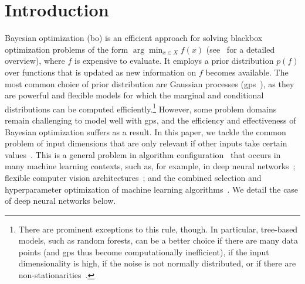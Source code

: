 \documentclass{article}
\newcommand{\bo}{{\sc bo}}
\newcommand{\gp}{{\sc gp}}
\begin{document}
\section{Introduction}
\vspace{-0.05in} 


Bayesian optimization (\bo) is an efficient approach for solving blackbox optimization problems of the form $\arg\min_{x \in X} f(x)$ (see~\cite{Brochu2010} for a detailed overview), where $f$ is expensive to evaluate. 
It employs a prior distribution $p(f)$ over functions that is updated as new information on $f$ becomes available.
%
The most common choice of prior distribution are Gaussian processes (\gp s~\cite{rasmussen38gaussian}), as they are powerful and flexible models for which the marginal and conditional distributions can be computed efficiently.\footnote{There are prominent exceptions to this rule, though. In particular, tree-based models, such as random forests, can be a better choice if there are many data points (and \gp s thus become computationally inefficient), if the input dimensionality is high, if the noise is not normally distributed, or if there are non-stationarities~\cite{TadGraPol11,HutHooLey11,BerEtAl11}.}
%
However, some problem domains remain challenging to model well with \gp s, and the efficiency and effectiveness of Bayesian optimization suffers as a result. In this paper, we tackle the common problem of input dimensions that are only relevant if other inputs take certain values~\cite{Hut09:phd,BergstraJ2011}. This is a general problem in algorithm configuration~\cite{Hut09:phd} that occurs in many machine learning contexts, such as, for example, in deep neural networks~\cite{HinOsiTeh06}; flexible computer vision architectures~\cite{BerYamCox13}; and the combined selection and hyperparameter optimization of machine learning algorithms~\cite{ThoEtAl13}. We detail the case of deep neural networks below.
\end{document}
